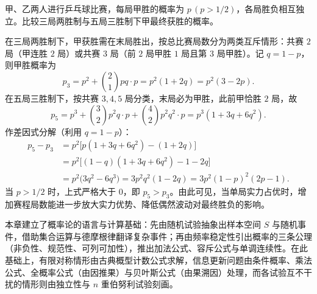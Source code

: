 \begin{example}[title={三局两胜制与五局三胜制的比较}]
\label{eg:match-format}
甲、乙两人进行乒乓球比赛，每局甲胜的概率为 $p\,(p>1/2)$，各局胜负相互独立。比较三局两胜制与五局三胜制下甲最终获胜的概率。
\begin{solution}
在三局两胜制下，甲获胜需在末局胜出，按总比赛局数分为两类互斥情形：共赛 $2$ 局（甲连胜 $2$ 局）或共赛 $3$ 局（前 $2$ 局甲胜 $1$ 局且第 $3$ 局甲胜）。记 $q=1-p$，则甲胜概率为
\[
  p_3=p^2+\binom{2}{1}pq\cdot p=p^2(1+2q)=p^2(3-2p).
\]
在五局三胜制下，按共赛 $3,4,5$ 局分类，末局必为甲胜，此前甲恰胜 $2$ 局，故
\[
  p_5=p^3+\binom{3}{2}p^2q\cdot p+\binom{4}{2}p^2q^2\cdot p
     =p^3(1+3q+6q^2).
\]
作差因式分解（利用 $q=1-p$）：
\[
\begin{aligned}
  p_5-p_3
  &=p^2\bigl[p(1+3q+6q^2)-(1+2q)\bigr]\\
  &=p^2\bigl[(1-q)(1+3q+6q^2)-1-2q\bigr]\\
  &=p^2\bigl(3q^2-6q^3\bigr)=3p^2q^2(1-2q)=3p^2(1-p)^2(2p-1).
\end{aligned}
\]
当 $p>1/2$ 时，上式严格大于 $0$，即 $p_5>p_3$。由此可见，当单局实力占优时，增加赛程局数能进一步放大实力优势、降低偶然波动对最终胜负的影响。
\end{solution}
\end{example}

\begin{summary}[第一章核心脉络]
本章建立了概率论的语言与计算基础：先由随机试验抽象出样本空间 $S$ 与随机事件，借助集合运算与德摩根律翻译复杂事件；再由频率稳定性引出概率的三条公理（非负性、规范性、可列可加性），推出加法公式、容斥公式与单调连续性。在此基础上，有限对称情形由古典概型计数公式求解，信息更新问题由条件概率、乘法公式、全概率公式（由因推果）与贝叶斯公式（由果溯因）处理，而各试验互不干扰的情形则由独立性与 $n$ 重伯努利试验刻画。
\end{summary}
